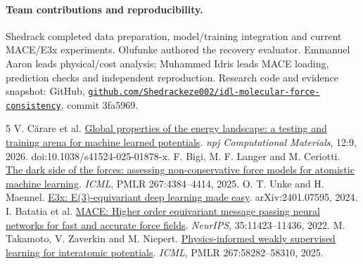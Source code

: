 \documentclass{article}
\begin{document}
\paragraph{Team contributions and reproducibility.}
{\raggedright Shedrack completed data preparation, model/training integration and current MACE/E3x experiments. Olufunke authored the recovery evaluator. Emmanuel Aaron leads physical/cost analysis; Muhammed Idris leads MACE loading, prediction checks and independent reproduction. Research code and evidence snapshot: GitHub, \href{https://github.com/Shedrackeze002/idl-molecular-force-consistency/tree/3fa5969e5a0c2fdeaebc76a05bace20799715203}{\nolinkurl{github.com/Shedrackeze002/idl-molecular-force-consistency}}, commit 3fa5969.\par}
\clearpage
\begin{thebibliography}{5}\small
{} V. C\u{a}rare et al. \href{https://doi.org/10.1038/s41524-025-01878-x}{Global properties of the energy landscape: a testing and training arena for machine learned potentials}. \emph{npj Computational Materials}, 12:9, 2026. doi:10.1038/s41524-025-01878-x.
 F. Bigi, M. F. Langer and M. Ceriotti. \href{https://proceedings.mlr.press/v267/bigi25a.html}{The dark side of the forces: assessing non-conservative force models for atomistic machine learning}. \emph{ICML}, PMLR 267:4384--4414, 2025.
 O. T. Unke and H. Maennel. \href{https://arxiv.org/abs/2401.07595}{E3x: E(3)-equivariant deep learning made easy}. arXiv:2401.07595, 2024.
 I. Batatia et al. \href{https://arxiv.org/abs/2206.07697}{MACE: Higher order equivariant message passing neural networks for fast and accurate force fields}. \emph{NeurIPS}, 35:11423--11436, 2022.
 M. Takamoto, V. Zaverkin and M. Niepert. \href{https://proceedings.mlr.press/v267/takamoto25a.html}{Physics-informed weakly supervised learning for interatomic potentials}. \emph{ICML}, PMLR 267:58282--58310, 2025.
\end{thebibliography}
\end{document}
